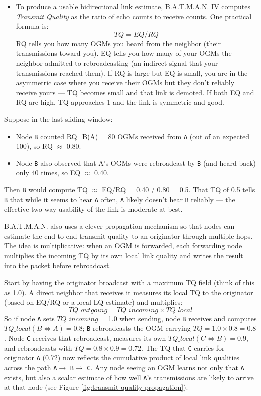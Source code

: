 \begin{itemize}
    \item To produce a usable bidirectional link estimate, B.A.T.M.A.N. IV computes \textit{Transmit Quality} as the ratio of echo counts to receive counts. One practical formula is:
    \begin{equation*}
        TQ = EQ / RQ        
    \end{equation*}
    RQ tells you how many OGMs you heard from the neighbor (their transmissions toward you). EQ tells you how many of your OGMs the neighbor admitted to rebroadcasting (an indirect signal that your transmissions reached them). If RQ is large but EQ is small, you are in the asymmetric case where you receive their OGMs but they don't reliably receive yours — TQ becomes small and that link is demoted. If both EQ and RQ are high, TQ approaches 1 and the link is symmetric and good.
\end{itemize}

Suppose in the last sliding window:
    \begin{itemize}
        \item Node \texttt{B} counted RQ\_B(A) = 80 OGMs received from \texttt{A} (out of an expected 100), so RQ $\approx$ 0.80.
        \item Node \texttt{B} also observed that A’s OGMs were rebroadcast by \texttt{B} (and heard back) only 40 times, so EQ $\approx$ 0.40.
    \end{itemize}   
Then \texttt{B} would compute TQ $\approx$ EQ/RQ = 0.40 / 0.80 = 0.5. That TQ of 0.5 tells \texttt{B} that while it seems to hear \texttt{A} often, \texttt{A} likely doesn’t hear \texttt{B} reliably — the effective two-way usability of the link is moderate at best.

B.A.T.M.A.N. also uses a clever propagation mechanism so that nodes can estimate the end-to-end transmit quality to an originator through multiple hops. The idea is multiplicative: when an OGM is forwarded, each forwarding node multiplies the incoming TQ by its own local link quality and writes the result into the packet before rebroadcast.

Start by having the originator broadcast with a maximum TQ field (think of this as 1.0). A direct neighbor that receives it measures its local TQ to the originator (based on EQ/RQ or a local LQ estimate) and multiplies:
\begin{equation*}
    TQ\_outgoing = TQ\_incoming \times TQ\_local    
\end{equation*}
So if node \texttt{A} sets $TQ\_incoming$ = 1.0 when sending, node \texttt{B} receives and computes $TQ\_local(B\iff A) = 0.8$; \texttt{B} rebroadcasts the OGM carrying $TQ = 1.0 \times 0.8 = 0.8$. Node \texttt{C} receives that rebroadcast, measures its own $TQ\_local(C\iff B) = 0.9$, and rebroadcasts with $TQ = 0.8 \times 0.9 = 0.72$. The TQ that \texttt{C} carries for originator \texttt{A} (0.72) now reflects the cumulative product of local link qualities across the path \texttt{A}$\to$ \texttt{B}$\to$ \texttt{C}. Any node seeing an OGM learns not only that \texttt{A} exists, but also a scalar estimate of how well \texttt{A}’s transmissions are likely to arrive at that node (see Figure \ref{fig:transmit-quality-propagation}).

